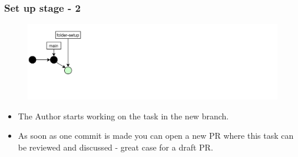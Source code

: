 \documentclass[aspectratio=169]{beamer}
\begin{document}
\begin{frame}
	\frametitle{Set up stage - 2}

	\vspace{-.5cm}
	\begin{minipage}[t][5cm][t]{\textwidth}
		\begin{figure}
			\centering
			\includegraphics[width=\textwidth]{./img/dime-gitflow-network-1-1.png}
		\end{figure}
	\end{minipage}

	\vspace{-.5cm}
	\begin{minipage}[t][5cm][t]{\textwidth}
		\begin{itemize}
			\setlength\itemsep{.5em}
			\item The Author starts working on the task in the new branch.
			\item As soon as one commit is made you can open a new PR 
			where this task can be reviewed and discussed - great case for a draft PR.
		\end{itemize}
	\end{minipage}

\end{frame}
\end{document}
